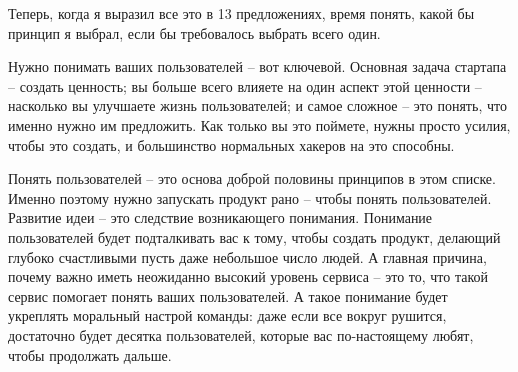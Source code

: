\documentclass[ebook,12pt,oneside,openany]{memoir}
\begin{document}
Теперь, когда я выразил все это в 13 предложениях, время понять, какой
бы принцип я выбрал, если бы требовалось выбрать всего один.

Нужно понимать ваших пользователей – вот ключевой. Основная задача
стартапа – создать ценность; вы больше всего влияете на один аспект
этой ценности – насколько вы улучшаете жизнь пользователей; и самое
сложное – это понять, что именно нужно им предложить. Как только вы
это поймете, нужны просто усилия, чтобы это создать, и большинство
нормальных хакеров на это способны.

Понять пользователей – это основа доброй половины принципов в этом
списке. Именно поэтому нужно запускать продукт рано – чтобы понять
пользователей. Развитие идеи – это следствие возникающего понимания.
Понимание пользователей будет подталкивать вас к тому, чтобы создать
продукт, делающий глубоко счастливыми пусть даже небольшое число
людей. А главная причина, почему важно иметь неожиданно высокий
уровень сервиса – это то, что такой сервис помогает понять ваших
пользователей. А такое понимание будет укреплять моральный настрой
команды: даже если все вокруг рушится, достаточно будет десятка
пользователей, которые вас по-настоящему любят, чтобы продолжать
дальше.
\end{document}
